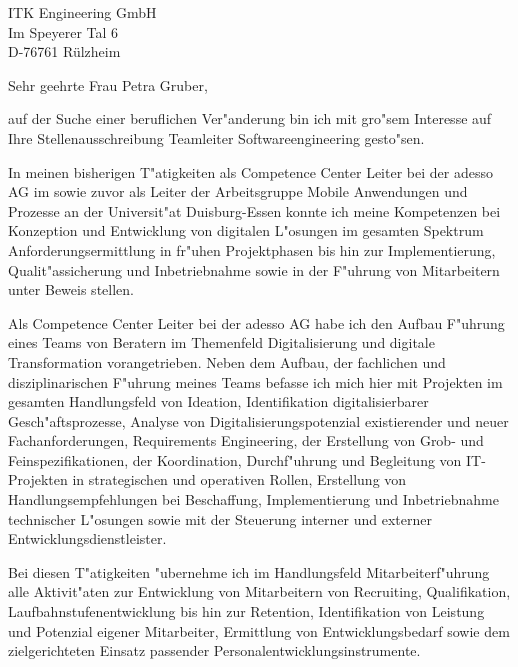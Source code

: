 \documentclass[10pt,a4paper]{dinbrief}
\date{\today}
\begin{document}
 
\begin{letter}  
{%
	ITK Engineering GmbH\\
	Im Speyerer Tal 6\\
	D-76761 Rülzheim
}
\subject{\bf Bewerbung Teamleiter Softwareengineering}
\opening{Sehr geehrte Frau Petra Gruber,}
auf der Suche einer beruflichen Ver"anderung bin ich mit gro"sem Interesse auf Ihre Stellenausschreibung Teamleiter Softwareengineering gesto"sen. 

In meinen bisherigen T"atigkeiten als Competence Center Leiter bei der adesso AG im sowie zuvor als Leiter der Arbeitsgruppe Mobile Anwendungen und Prozesse an der Universit"at Duisburg-Essen konnte ich meine Kompetenzen bei Konzeption und Entwicklung von digitalen L"osungen im gesamten Spektrum Anforderungsermittlung in fr"uhen Projektphasen bis hin zur Implementierung, Qualit"assicherung und Inbetriebnahme sowie in der F"uhrung von Mitarbeitern unter Beweis stellen.


Als Competence Center Leiter bei der adesso AG habe ich den Aufbau F"uhrung eines Teams von Beratern im Themenfeld Digitalisierung und digitale Transformation vorangetrieben. Neben dem Aufbau, der fachlichen und disziplinarischen F"uhrung meines Teams befasse ich mich hier mit Projekten im gesamten Handlungsfeld von Ideation, Identifikation digitalisierbarer Gesch"aftsprozesse, Analyse von Digitalisierungspotenzial existierender und neuer Fachanforderungen, Requirements Engineering, der Erstellung von Grob- und Feinspezifikationen, der Koordination, Durchf"uhrung und Begleitung von IT-Projekten in strategischen und operativen Rollen, Erstellung von Handlungsempfehlungen bei Beschaffung, Implementierung und Inbetriebnahme technischer L"osungen sowie mit der Steuerung interner und externer Entwicklungsdienstleister. 

Bei diesen T"atigkeiten "ubernehme ich im Handlungsfeld Mitarbeiterf"uhrung alle Aktivit"aten zur Entwicklung von Mitarbeitern von Recruiting, Qualifikation, Laufbahnstufenentwicklung bis hin zur Retention, Identifikation von Leistung und Potenzial eigener Mitarbeiter, Ermittlung von Entwicklungsbedarf sowie dem zielgerichteten Einsatz passender Personalentwicklungsinstrumente.


\end{letter}
\end{document}
